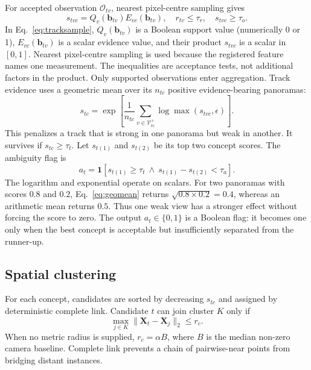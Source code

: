 \documentclass[a4paper,9pt]{extarticle}
\begin{document}
For accepted observation $\mathcal O_{tv}$, nearest pixel-centre sampling gives
\begin{equation}
 s_{tvc}=Q_v(\mathbf b_{tv})E_{vc}(\mathbf b_{tv}),
 \quad r_{tv}\le\tau_r,\quad s_{tvc}\ge\tau_o.
 \label{eq:tracksample}
\end{equation}
In Eq.~\ref{eq:tracksample}, $Q_v(\mathbf b_{tv})$ is a Boolean support value
(numerically 0 or 1), $E_{vc}(\mathbf b_{tv})$ is a scalar evidence value, and
their product $s_{tvc}$ is a scalar in $[0,1]$. Nearest pixel-centre sampling
is used because the registered feature names one measurement. The inequalities
are acceptance tests, not additional factors in the product.
Only supported observations enter aggregation. Track evidence uses a geometric mean over its $n_{tc}$ positive evidence-bearing panoramas:
\begin{equation}
 s_{tc}=\exp\!\left[
 \frac{1}{n_{tc}}
 \sum_{v\in\mathcal V^+_{tc}}
 \log\max(s_{tvc},\epsilon)\right].
 \label{eq:geomean}
\end{equation}
This penalizes a track that is strong in one panorama but weak in another. It survives if $s_{tc}\ge\tau_t$. Let $s_{t(1)}$ and $s_{t(2)}$ be its top two concept scores. The ambiguity flag is
\begin{equation}
 a_t=\mathbf 1\!\left[
 s_{t(1)}\ge\tau_t\ \wedge\
 s_{t(1)}-s_{t(2)}<\tau_a\right].
 \label{eq:ambiguity}
\end{equation}
The logarithm and exponential operate on scalars. For two panoramas with
scores $0.8$ and $0.2$, Eq.~\ref{eq:geomean} returns
$\sqrt{0.8\times0.2}=0.4$, whereas an arithmetic mean returns $0.5$. Thus one
weak view has a stronger effect without forcing the score to zero. The output
$a_t\in\{0,1\}$ is a Boolean flag: it becomes one only when the best concept is
acceptable but insufficiently separated from the runner-up.

\subsection{Spatial clustering}

For each concept, candidates are sorted by decreasing $s_{tc}$ and assigned by deterministic complete link. Candidate $t$ can join cluster $K$ only if
\begin{equation}
 \max_{j\in K}\|\mathbf X_t-\mathbf X_j\|_2\le r_c.
 \label{eq:completelink}
\end{equation}
When no metric radius is supplied, $r_c=\alpha B$, where $B$ is the median non-zero camera baseline. Complete link prevents a chain of pairwise-near points from bridging distant instances.
\end{document}
